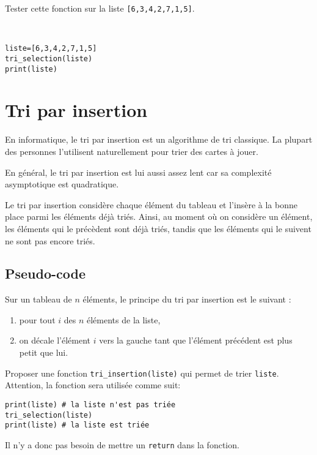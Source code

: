 \begin{exercice}
Tester cette fonction sur la liste \verb?[6,3,4,2,7,1,5]?.
\end{exercice}

\begin{solution}~\\
\vspace{-0.7cm}
\begin{verbatim}
liste=[6,3,4,2,7,1,5]
tri_selection(liste)
print(liste)
\end{verbatim}    
\end{solution}

\section{Tri par insertion}

En informatique, le tri par insertion est un algorithme de tri classique. La plupart des personnes l'utilisent naturellement pour trier des cartes à jouer.

En général, le tri par insertion est lui aussi assez lent car sa complexité asymptotique est quadratique. 

Le tri par insertion considère chaque élément du tableau et l'insère à la bonne place parmi les éléments déjà triés. Ainsi, au moment où on considère un élément, les éléments qui le précèdent sont déjà triés, tandis que les éléments qui le suivent ne sont pas encore triés. 

\subsection{Pseudo-code}

Sur un tableau de $n$ éléments, le principe du tri par insertion est le suivant :
\begin{enumerate}
 \item pour tout $i$ des $n$ éléments de la liste,
 \item on décale l'élément $i$ vers la gauche tant que l'élément précédent est plus petit que lui.
\end{enumerate}

\begin{exercice}
Proposer une fonction \verb?tri_insertion(liste)? qui permet de trier \verb?liste?. Attention, la fonction sera utilisée comme suit:
\begin{verbatim}
print(liste) # la liste n'est pas triée
tri_selection(liste)
print(liste) # la liste est triée
\end{verbatim}

Il n'y a donc pas besoin de mettre un \verb?return? dans la fonction.
\end{exercice}

